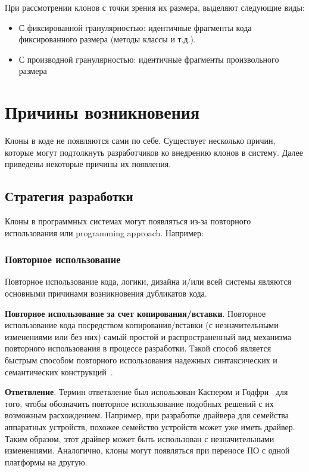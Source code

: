 При рассмотрении клонов с точки зрения их размера, выделяют следующие виды:
\begin{itemize}
\setlength\itemsep{0mm}
\item С фиксированной гранулярностью: идентичные фрагменты кода фиксированного размера (методы классы и т.д.).
\item С производной гранулярностью: идентичные фрагменты произвольного размера
\end{itemize}


\section{Причины возникновения}

Клоны в коде не появляются сами по себе. Существует несколько причин, которые могут подтолкнуть разработчиков ко внедрению клонов в систему. Далее приведены некоторые причины их появления.

\subsection{Стратегия разработки}

Клоны в программных системах могут появляться из-за повторного использования или programming approach. Например:

\subsubsection{Повторное использование}

Повторное использование кода, логики, дизайна и/или всей системы являются основными причинами возникновения дубликатов кода.

\textbf{Повторное использование за счет копирования/вставки}. Повторное использование кода посредством копирования/вставки (с незначительными изменениями или без них) самый простой и распространенный вид механизма повторного использования в процессе разработки. Такой способ является быстрым способом повторного использования надежных синтаксических и семантических конструкций~\cite{copypaste}.

\textbf{Ответвление}. Термин ответвление был использован Каспером и Годфри~\cite{forking} для того, чтобы обозначить повторное использование подобных решений с их возможным расхождением. Например, при разработке драйвера для семейства аппаратных устройств, похожее семейство устройств может уже иметь драйвер. Таким образом, этот драйвер может быть использован с незначительными изменениями. Аналогично, клоны могут появляться при переносе ПО с одной платформы на другую. 

